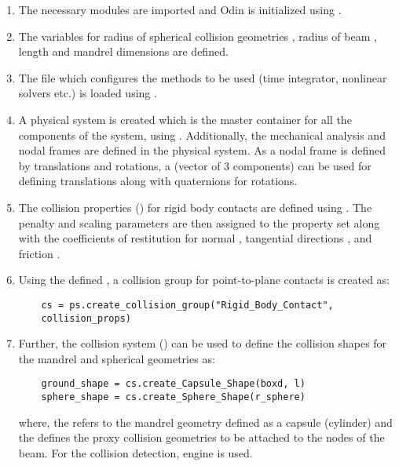 \begin{enumerate}
    \item The necessary modules are imported and Odin is initialized using .
    \item The variables for radius of spherical collision geometries , radius of beam , length  and mandrel dimensions are defined.
    \item The  file which configures the methods to be used (time integrator, nonlinear solvers etc.) is loaded using .
    \item A physical system is created which is the master container for all the components of the system, using . Additionally, the mechanical analysis and nodal frames are defined in the physical system. As a nodal frame is defined by translations and rotations, a  (vector of 3 components) can be used for defining translations along with quaternions for rotations.
    \item The collision properties () for rigid body contacts are defined using . The penalty and scaling parameters are then assigned to the property set along with the coefficients of restitution for normal , tangential directions , and friction .
    \item Using the defined  , a collision group for point-to-plane contacts is created as:
    \pythonstyle
    \begin{tcolorbox}\begin{lstlisting}
    cs = ps.create_collision_group("Rigid_Body_Contact", 
    collision_props)
    \end{lstlisting}\end{tcolorbox}
    \item Further, the collision system () can be used to define the collision shapes for the mandrel and spherical geometries as:
    \pythonstyle
    \begin{tcolorbox}\begin{lstlisting}
    ground_shape = cs.create_Capsule_Shape(boxd, l)
    sphere_shape = cs.create_Sphere_Shape(r_sphere)
    \end{lstlisting}\end{tcolorbox}
    where, the  refers to the mandrel geometry defined as a capsule (cylinder) and the  defines the proxy collision geometries to be attached to the nodes of the beam. For the collision detection,  engine is used.

\end{enumerate}
